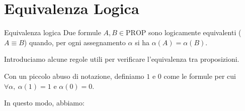 \documentclass[a4paper,11pt]{report}
\begin{document}
        \section{Equivalenza Logica}

        \begin{defbox}[colframe=PineGreen, colback=DeepGreenLight]{Equivalenza logica}{}
            Due formule \( A, B \in \text{PROP} \) sono logicamente equivalenti (\( A \equiv B \)) quando, per ogni assegnamento \( \alpha \) si ha \( \alpha(A) = \alpha(B) \).
        \end{defbox}


        Introduciamo alcune regole utili per verificare l'equivalenza tra proposizioni.

        Con un piccolo abuso di notazione, definiamo \( 1 \) e \( 0 \) come le formule per cui \( \forall \alpha, \ \alpha(1)= 1 \) e \( \alpha(0) = 0 \).

        In questo modo, abbiamo:
\end{document}

